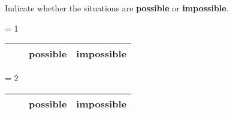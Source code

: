 \ifnum {} \newpage \fi
   
\question[5] Indicate whether the situations are \textbf{possible} or \textbf{impossible}.

\ifnum \SetNumber = 1
    \vspace{-0.8cm}
    \setlength{\extrarowheight}{0.20cm}
    \begin{center}
    \hspace{-.9cm}\begin{tabular}{ p{0.20cm} p{12.5cm} p{1.4cm} p{1.75cm} }
        
        & & possible &  impossible  \\[2pt] \hline 
        
        
        
        
        
    
    \end{tabular}
    \end{center}
    \setlength{\extrarowheight}{0.0cm}
    \vspace{-6pt} 
\fi 

\ifnum \SetNumber = 2
    \vspace{-0.8cm}
    \setlength{\extrarowheight}{0.20cm}
    \begin{center}
    \hspace{-.9cm}\begin{tabular}{ p{0.20cm} p{12.5cm} p{1.4cm} p{1.75cm} }
        
        & & possible &  impossible  \\[2pt] \hline 
        
        
        
                
        
    
    \end{tabular}
    \end{center}
    \setlength{\extrarowheight}{0.0cm}
    \vspace{-6pt} 
\fi 
